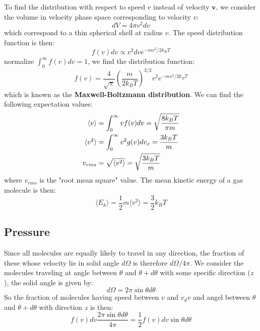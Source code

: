 \documentclass{article}
\begin{document}
To find the distribution with respect to speed $v$ instead of velocity $\mathbf{v}$, we 
consider the volume in velocity phase space corresponding to velocity $v$:
\begin{equation}
    dV = 4\pi v^2 dv
\end{equation}
which correspond to a thin spherical shell at radius $v$. The speed distribution function is then:
\begin{equation}
    f(v) dv \propto v^2 dv e^{-mv^2/2k_BT}
\end{equation}
normalize $\int_0^{\infty}f(v)dv = 1$, we find the distribution function:
\begin{equation}
    f(v) = \frac{4}{\sqrt{\pi}}\left(\frac{m}{2k_BT}\right)^{3/2} v^2 e^{-mv^2/2k_BT}
\end{equation}
which is known as the \textbf{Maxwell-Boltzmann distribution}. 
We can find the following expectation values:
\begin{align}
    \langle v \rangle &= \int_{0}^{\infty} v f(v) dv = \sqrt{\frac{8k_BT}{\pi m}} \notag \\
    \langle v^2 \rangle &= \int_{0}^{\infty} v^2 g(v) dv_x = \frac{3k_BT}{m} \notag  \\
    v_{rms} &= \sqrt{\langle v^2 \rangle} = \sqrt{\frac{3k_BT}{m}}
\end{align}
where $v_{rms}$ is the "root mean square" value. 
The mean kinetic energy of a gas molecule is then:
\begin{equation}
    \langle E_k \rangle = \frac{1}{2}m \langle v^2 \rangle = \frac{3}{2}k_BT
\end{equation}

\subsection{Pressure}
Since all molecules are equally likely to travel in any direction, the fraction of these 
whose velocity lie in solid angle $d\Omega$ is therefore $d\Omega/4\pi$. We consider the 
molecules traveling at angle between $\theta$ and $\theta + d\theta$ with some specific direction ($z$),
the solid angle is given by:
\begin{equation}
    d\Omega = 2\pi \sin\theta d\theta
\end{equation}
So the fraction of molecules having speed between $v$ and $v_dv$ and angel between $\theta$ 
and $\theta + d\theta$ with direction $z$ is then:
\begin{equation}
    f(v) dv \frac{2\pi \sin\theta d\theta}{4\pi} = \frac{1}{2} f(v) dv \sin\theta d\theta 
\end{equation}
\end{document}
